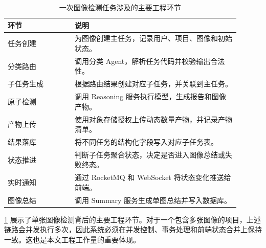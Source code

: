 \begin{table}[!htb]
  \caption{一次图像检测任务涉及的主要工程环节}\label{tab:detection-engineering-steps}
  \centering
  \begin{tabular}{@{}p{0.26\linewidth}p{0.64\linewidth}@{}} \toprule
    \textbf{环节} & \textbf{说明} \\ \midrule
    任务创建 & 为图像创建主任务，记录用户、项目、图像和初始状态。 \\
    分类路由 & 调用分类 Agent，解析任务代码并校验输出合法性。 \\
    子任务生成 & 根据路由结果创建对应子任务，并关联到主任务。 \\
    原子检测 & 调用 Reasoning 服务执行模型，生成报告和图像产物。 \\
    产物上传 & 使用对象存储授权上传动态数量产物，并记录产物清单。 \\
    结果落库 & 将不同任务的结构化字段写入对应子任务表。 \\
    状态推进 & 判断子任务聚合状态，决定是否进入图像总结或失败终态。 \\
    实时通知 & 通过 RocketMQ 和 WebSocket 将状态变化推送给前端。 \\
    图像总结 & 调用 Summary 服务生成单图总结并写入数据库。 \\ \bottomrule
  \end{tabular}
\end{table}

\cref{tab:detection-engineering-steps} 展示了单张图像检测背后的主要工程环节。对于一个包含多张图像的项目，上述链路会并发执行多次，因此系统必须在并发控制、事务处理和前端状态合并上保持一致。这也是本文工程工作量的重要体现。
